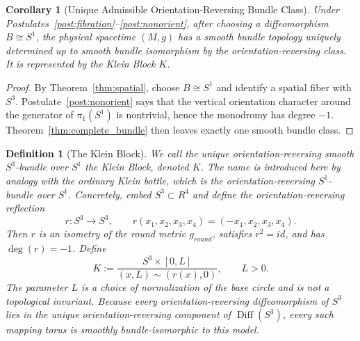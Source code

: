 \documentclass[11pt]{article}
\theoremstyle{canonmath}
\newtheorem{corollary}[theorem]{Corollary}
\newtheorem{definition}[theorem]{Definition}
\theoremstyle{canonpostulate}
\theoremstyle{canonproposition}
\providecommand{\Klein}{\mathcal{K}}
\providecommand{\M}{\mathcal{M}}
\providecommand{\R}{\mathbb{R}}
\providecommand{\Sone}{S^1}
\providecommand{\Sthree}{S^3}
\providecommand{\Diff}{\operatorname{Diff}}
\providecommand{\id}{\mathrm{id}}
\providecommand{\degfn}{\operatorname{deg}}
\def\mathrm#1{#1}%
\def\mathbb#1{#1}%
\def\mathcal#1{#1}%
\begin{document}
\begin{corollary}[Unique Admissible Orientation-Reversing Bundle Class] \label{cor:physical_unique}
Under Postulates~\ref{post:fibration}--\ref{post:nonorient}, after choosing a diffeomorphism $B\cong\Sone$, the physical spacetime $(\M,g)$ has a smooth bundle topology uniquely determined up to smooth bundle isomorphism by the orientation-reversing class. It is represented by the Klein Block $\Klein$.
\end{corollary}
\begin{proof}
By Theorem~\ref{thm:spatial}, choose $B\cong\Sone$ and identify a spatial fiber with $\Sthree$. Postulate~\ref{post:nonorient} says that the vertical orientation character around the generator of $\pi_1(\Sone)$ is nontrivial, hence the monodromy has degree $-1$. Theorem~\ref{thm:complete_bundle} then leaves exactly one smooth bundle class.
\end{proof}

\begin{definition}[The Klein Block] \label{def:klein}
We call the unique orientation-reversing smooth $\Sthree$-bundle over $\Sone$ the \emph{Klein Block}, denoted $\Klein$. The name is introduced here by analogy with the ordinary Klein bottle, which is the orientation-reversing $S^1$-bundle over $S^1$. Concretely, embed $\Sthree\subset\R^4$ and define the orientation-reversing reflection
\[
r:\Sthree\to\Sthree,
\qquad
r(x_1,x_2,x_3,x_4)=(-x_1,x_2,x_3,x_4).
\]
Then $r$ is an isometry of the round metric $g_{\mathrm{round}}$, satisfies $r^2=\id$, and has $\degfn(r)=-1$. Define
\begin{equation}
    \Klein := \frac{\Sthree\times[0,L]}{(x,L)\sim(r(x),0)},
    \qquad L>0.
\end{equation}
The parameter $L$ is a choice of normalization of the base circle and is not a topological invariant. Because every orientation-reversing diffeomorphism of $\Sthree$ lies in the unique orientation-reversing component of $\Diff(\Sthree)$, every such mapping torus is smoothly bundle-isomorphic to this model.
\end{definition}
\end{document}
